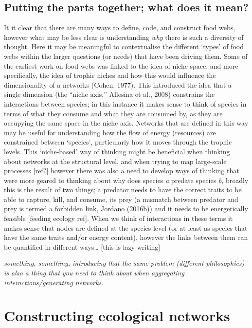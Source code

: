 \documentclass[
]{article}
\begin{document}
\subsection{Putting the parts together; what does it
mean?}\label{putting-the-parts-together-what-does-it-mean}

It it clear that there are many ways to define, code, and construct food
webs, however what may be less clear is understanding \emph{why} there
is such a diversity of thought. Here it may be meaningful to
contextualise the different `types' of food webs within the larger
questions (or needs) that have been driving them. Some of the earliest
work on food webs was linked to the idea of niche space, and more
specifically, the idea of trophic niches and how this would influence
the dimensionality of a networks (Cohen, 1977). This introduced the idea
that a single dimension (the ``niche axis,'' Allesina et al., 2008)
constrains the interactions between species; in this instance it makes
sense to think of species in terms of what they consume and what they
are consumed by, as they are occupying the same space in the niche axis.
Networks that are defined in this way may be useful for understanding
how the flow of energy (resources) are constrained between `species',
particularly how it moves through the trophic levels. This `niche-based'
way of thinking might be beneficial when thinking about networks at the
structural level, and when trying to map large-scale processes
{[}ref?{]} however there was also a need to develop ways of thinking
that were more geared to thinking about why does species \emph{a}
predate species \emph{b}, broadly this is the result of two things; a
predator needs to have the correct traits to be able to capture, kill,
and consume, its prey (a mismatch between predator and prey is termed a
forbidden link, Jordano (2016b)) and it needs to be energetically
feasible {[}feeding ecology ref{]}. When we think of interactions in
these terms it makes sense that nodes are defined at the species level
(or at least as species that have the same traits and/or energy
content), however the links between them can be quantified in different
ways\ldots{} {[}this is lazy writing{]}

\emph{something, something, introducing that the same problem (different
philosophies) is also a thing that you need to think about when
aggregating interactions/generating networks.}

\section{Constructing ecological
networks}\label{constructing-ecological-networks}
\end{document}
